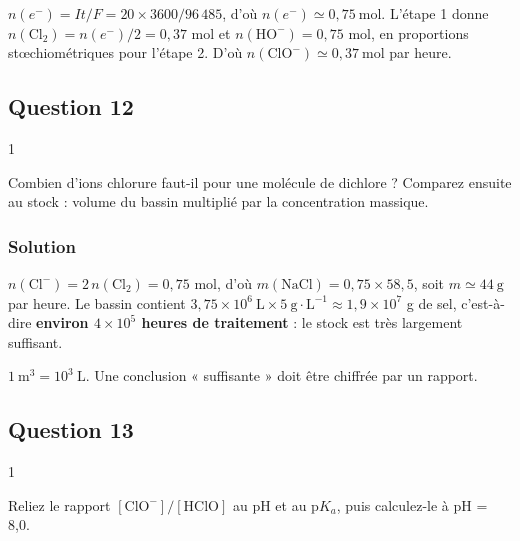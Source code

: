 \documentclass[11pt,a4paper]{article}
\begin{document}
\(n(e^-) = It/F = 20\times 3600/96\,485\), d'où \(\boxed{n(e^-) \simeq 0{,}75\ \mathrm{mol}}\). L'étape 1 donne \(n(\mathrm{Cl_2}) = n(e^-)/2 = 0{,}37\) mol et \(n(\mathrm{HO^-}) = 0{,}75\) mol, en proportions stœchiométriques pour l'étape 2. D'où \(\boxed{n(\mathrm{ClO^-}) \simeq 0{,}37\ \mathrm{mol}}\) par heure.

\hypertarget{question-12}{%
\subsection{Question 12}\label{question-12}}

\begin{indication}{1}

Combien d'ions chlorure faut-il pour une molécule de dichlore ? Comparez ensuite au stock : volume du bassin multiplié par la concentration massique.

\end{indication}

\hypertarget{solution-11}{%
\subsubsection{Solution}\label{solution-11}}

\(n(\mathrm{Cl^-}) = 2\,n(\mathrm{Cl_2}) = 0{,}75\) mol, d'où \(m(\mathrm{NaCl}) = 0{,}75\times 58{,}5\), soit \(\boxed{m \simeq 44\ \mathrm g}\) par heure. Le bassin contient \(3{,}75\times 10^6\ \mathrm L\times 5\ \mathrm{g\cdot L^{-1}} \approx 1{,}9\times 10^7\) g de sel, c'est-à-dire \textbf{environ \(4\times 10^5\) heures de traitement} : le stock est très largement suffisant.

\begin{piege}

\(1\ \mathrm{m^3} = 10^3\ \mathrm L\). Une conclusion « suffisante » doit être chiffrée par un rapport.

\end{piege}

\hypertarget{question-13}{%
\subsection{Question 13}\label{question-13}}

\begin{indication}{1}

Reliez le rapport \([\mathrm{ClO^-}]/[\mathrm{HClO}]\) au pH et au \(\mathrm pK_a\), puis calculez-le à pH = 8,0.

\end{indication}
\end{document}
